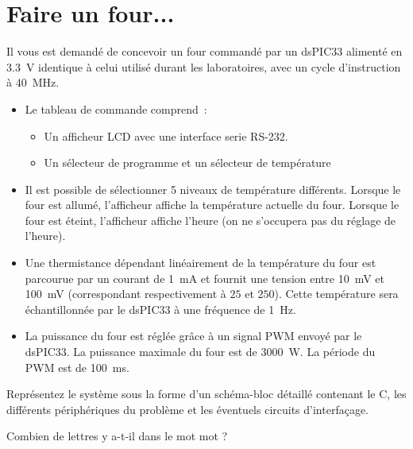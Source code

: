 \documentclass{exam}
\author{Ken Hasselmann}
\begin{document}

\newpage

\section{Faire un four...}

Il vous est demandé de concevoir un four commandé par un dsPIC33 alimenté en 3.3~V identique à celui utilisé durant les laboratoires, avec un cycle d'instruction à 40~MHz.

\begin{itemize}
	\item Le tableau de commande comprend~:
	\begin{itemize}
		\item Un afficheur LCD avec une interface serie RS-232.
		\item Un sélecteur de programme et un sélecteur de température
	\end{itemize}

	\item Il est possible de sélectionner 5 niveaux de température différents.
	Lorsque le four est allumé, l'afficheur affiche la température actuelle du four.
	Lorsque le four est éteint, l'afficheur affiche l'heure (on ne s'occupera pas du réglage de l'heure).

	\item Une thermistance dépendant linéairement de la température du four est parcourue par un courant de 1~mA et fournit une tension entre 10~mV et 100~mV (correspondant respectivement à $25$ et $250$).
	Cette température sera échantillonnée par le dsPIC33 à une fréquence de 1~Hz.

	\item La puissance du four est réglée grâce à un signal PWM envoyé par le dsPIC33.
	La puissance maximale du four est de 3000~W.
	La période du PWM est de 100~ms.

\end{itemize}

{
	Représentez le système sous la forme d'un schéma-bloc détaillé contenant le C, les différents périphériques du problème et les éventuels circuits d'interfaçage.

}
{}

{
    Combien de lettres y a-t-il dans le mot mot ?
}
{}

\end{document}
